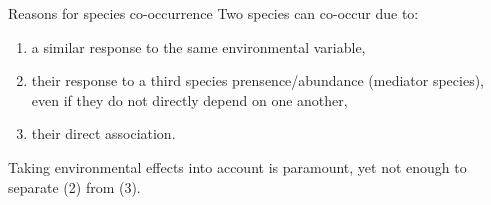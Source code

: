 \documentclass[11pt]{beamer}
\begin{document}

 
\begin{frame}{Reasons for species co-occurrence}
Two species can co-occur due to:
 \bigskip
 
\begin{enumerate}
\item a similar response to the same environmental variable,
\item their response to a third species prensence/abundance (mediator species), even if they do not directly depend on one another,
\item their direct association.\\
\end{enumerate}
 \bigskip
 
Taking environmental effects into account is paramount, yet not enough to separate (2) from (3).
 
\end{frame}
\end{document}
